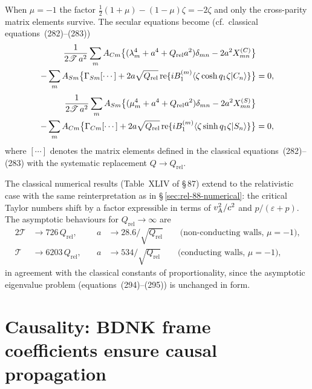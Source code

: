 When $\mu = -1$ the factor $\frac{1}{2}(1+\mu)-(1-\mu)\zeta = -2\zeta$
and only the cross-parity matrix elements survive.  The secular
equations become (cf.\ classical equations~(282)--(283))
\begin{align}
  \frac{1}{2\mathscr{T}\,a^2}\sum_m
    A_{Cm}\bigl\{(\lambda_m^4+a^4+Q_{\mathrm{rel}}a^2)\delta_{mn}
      - 2a^2 X_{mn}^{(C)}\bigr\}
  &\notag\\
  - \sum_m A_{Sm}\bigl\{\Gamma_{Sm}[\cdots]
    + 2a\sqrt{Q_{\mathrm{rel}}}\,
      \mathrm{re}\{iB_1^{(m)}\langle\zeta\cosh q_1\zeta|C_n\rangle\}
    \bigr\} &= 0,
  \label{eq:rel-9-282R}
\end{align}
\begin{align}
  \frac{1}{2\mathscr{T}\,a^2}\sum_m
    A_{Sm}\bigl\{(\mu_m^4+a^4+Q_{\mathrm{rel}}a^2)\delta_{mn}
      - 2a^2 X_{mn}^{(S)}\bigr\}
  &\notag\\
  - \sum_m A_{Cm}\bigl\{\Gamma_{Cm}[\cdots]
    + 2a\sqrt{Q_{\mathrm{rel}}}\,
      \mathrm{re}\{iB_1^{(m)}\langle\zeta\sinh q_1\zeta|S_n\rangle\}
    \bigr\} &= 0,
  \label{eq:rel-9-283R}
\end{align}
where $[\cdots]$ denotes the matrix elements defined in the classical
equations~(282)--(283) with the systematic replacement
$Q\to Q_{\mathrm{rel}}$.

The classical numerical results (Table~XLIV of \S\,87) extend to the
relativistic case with the same reinterpretation as in
\S\,\ref{sec:rel-88-numerical}: the critical Taylor numbers shift by
a factor expressible in terms of $v_{\mathrm{A}}^2/c^2$ and $p/(\varepsilon+p)$.
The asymptotic behaviours for $Q_{\mathrm{rel}}\to\infty$ are
\begin{alignat}{2}
  \mathscr{T} &\to 726\,Q_{\mathrm{rel}},\quad
  & a &\to 28.6/\sqrt{Q_{\mathrm{rel}}}
  \qquad\text{(non-conducting walls, } \mu=-1\text{),}
  \label{eq:rel-9-298R}\\[4pt]
  \mathscr{T} &\to 6203\,Q_{\mathrm{rel}},\quad
  & a &\to 534/\sqrt{Q_{\mathrm{rel}}}
  \qquad\text{(conducting walls, } \mu=-1\text{),}
  \label{eq:rel-9-299R}
\end{alignat}
in agreement with the classical constants of proportionality, since the
asymptotic eigenvalue problem (equations~(294)--(295)) is unchanged in
form.

\section*{Causality: BDNK frame coefficients ensure causal propagation}
\label{sec:rel-87-89-causality}


